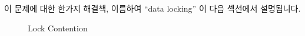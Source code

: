 \fi



이 문제에 대한 한가지 해결책, 이름하여 ``data locking'' 이 다음 섹션에서
설명됩니다.

\begin{figure}[tbh]
\centering
{}
\caption{Lock Contention}
\end{figure}

